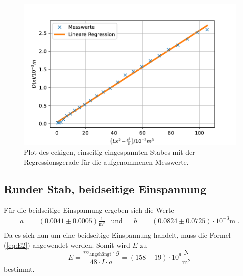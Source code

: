 \begin{figure}[H]
  \centering
  \includegraphics{pictures/Lineare Regression2.pdf}
  \caption{Plot des eckigen, einseitig eingespannten Stabes mit der Regressionsgerade für die aufgenommenen Messwerte.}
  \label{fig:plot2}
\end{figure}


\subsection{Runder Stab, beidseitige Einspannung}

Für die beidseitige Einspannung ergeben sich die Werte
\begin{align*}
  a &= (0.0041 ± 0.0005) \frac{1}{\unit{\meter\squared}} & \text{und}& & b&= (0.0824 ± 0.0725) \cdot 10^{-3} \unit\meter \text{ .} \\
\end{align*}
Da es sich nun um eine beidseitige Einspannung handelt, muss die Formel (\ref{eq:E2}) angewendet werden.
Somit wird $E$ zu
\begin{equation*}
  E = \frac{m_\text{angehängt} \cdot g}{48 \cdot I \cdot a} = (158 \pm 19) \cdot 10^{9} \frac{\unit\newton}{\unit\meter^2}
\end{equation*}
bestimmt.



